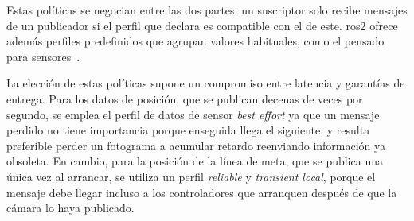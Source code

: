 Estas políticas se negocian entre las dos partes: un suscriptor solo recibe mensajes de un publicador si el perfil que declara es compatible con el de este. \gls{ros2} ofrece además perfiles predefinidos que agrupan valores habituales, como el pensado para sensores~\cite{ros2qos}.

La elección de estas políticas supone un compromiso entre latencia y garantías de entrega. Para los datos de posición, que se publican decenas de veces por segundo, se emplea el perfil de datos de sensor \textit{best effort} ya que un mensaje perdido no tiene importancia porque enseguida llega el siguiente, y resulta preferible perder un fotograma a acumular retardo reenviando información ya obsoleta. En cambio, para la posición de la línea de meta, que se publica una única vez al arrancar, se utiliza un perfil \textit{reliable} y \textit{transient local}, porque el mensaje debe llegar incluso a los controladores que arranquen después de que la cámara lo haya publicado.

%
%
%
%
%

